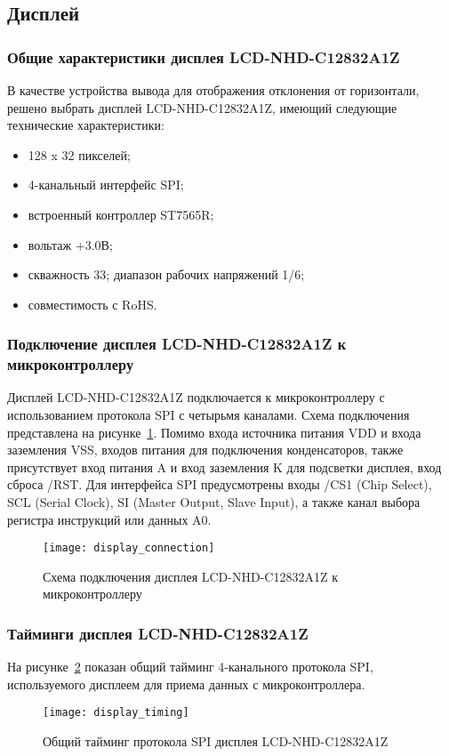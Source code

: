 \documentclass[document.tex]{subfiles}
\begin{document}
\clearpage
\subsection{Дисплей}
\subsubsection{Общие характеристики дисплея LCD-NHD-C12832A1Z}
В качестве устройства вывода для отображения отклонения от горизонтали, решено выбрать дисплей LCD-NHD-C12832A1Z, имеющий следующие технические характеристики:
\begin{itemize}
	\item 128 x 32 пикселей;
	\item 4-канальный интерфейс SPI;
	\item встроенный контроллер ST7565R;
	\item вольтаж +3.0В;
	\item скважность 33; диапазон рабочих напряжений 1/6;
	\item совместимость с RoHS.\cite{display}
\end{itemize}
\subsubsection{Подключение дисплея LCD-NHD-C12832A1Z к микроконтроллеру}
Дисплей LCD-NHD-C12832A1Z подключается к микроконтроллеру с использованием про\-токола SPI с четырьмя каналами. Схема подключения представлена на
рисунке~\ref{fig:display_connection}. Помимо входа источника питания VDD и входа заземления VSS, входов питания для подключения конденсаторов, также присутствует вход питания A и
вход заземления K для подсветки дисплея, вход сброса /RST. Для интерфейса SPI предусмотрены входы /CS1 (Chip Select), SCL (Serial Clock), SI (Master Output, Slave Input), а также
канал выбора регистра инструкций или данных A0.\cite{display, lcd_interfaces}

\begin{figure}[here]
\centering
\texttt{[image: display\_connection]}
\caption{Схема подключения дисплея LCD-NHD-C12832A1Z к микроконтроллеру}
\label{fig:display_connection}
\end{figure}

\clearpage
\subsubsection{Тайминги дисплея LCD-NHD-C12832A1Z}
На рисунке~\ref{fig:display_timing} показан общий тайминг 4-канального протокола SPI, используемого дисплеем для приема данных с микроконтроллера.
\begin{figure}[here]
\centering
\texttt{[image: display\_timing]}
\caption{Общий тайминг протокола SPI дисплея LCD-NHD-C12832A1Z}
\label{fig:display_timing}
\end{figure}
\end{document}
